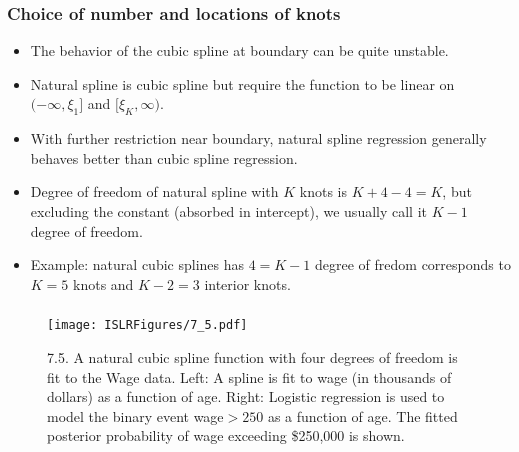 \documentclass{beamer}
\begin{document}
                  
                  \begin{frame}
                  	\frametitle{Choice of number and locations of knots  }
                  	\begin{itemize}
                  		\item The behavior of the cubic spline at boundary can be quite unstable.
                  		\item Natural spline is cubic spline but require the function to be linear
                  		on $(-\infty, \xi_1]$ and $[\xi_K, \infty)$. 
                  		\item With further restriction near boundary, natural spline regression
                  		generally behaves better than cubic spline regression.
                  		\item Degree of freedom of natural spline with $K$ knots is $K+4-4=K$, but
                  		excluding the constant (absorbed in intercept), we usually call it $K-1$ degree of freedom.
                  		\item Example: natural cubic splines has $4=K-1$ degree of fredom corresponds to 
                  		$K=5$ knots and $K-2=3$ interior knots.
                  		
                  	\end{itemize}
                  \end{frame} 
                  
                   
                   \begin{frame}
                   	\frametitle{ }
                   	\begin{figure}
                   		\centering
                   		
                   		\centering
                   		\texttt{[image: ISLRFigures/7\_5.pdf]}
                   		\caption{7.5. A natural cubic spline function with four degrees of freedom is
                   			fit to the Wage data. Left: A spline is fit to wage (in thousands of dollars) as
                   			a function of age. Right: Logistic regression is used to model the binary event
                   			wage$>250$ as a function of age. The fitted posterior probability of wage exceeding
                   			\$250,000 is shown.
                   		}
                   	\end{figure}
                   \end{frame}
                  
\end{document}
